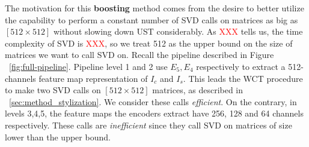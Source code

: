 The motivation for this \textbf{boosting} method comes from the desire to better utilize the capability to perform a constant number of SVD calls on matrices as big as $[512\times 512]$ without slowing down UST considerably. As \textcolor{red}{XXX} tells us, the time complexity of SVD is \textcolor{red}{XXX}, so we treat 512 as the upper bound on the size of matrices we want to call SVD on. Recall the pipeline described in Figure ~\ref{fig:full-pipeline}. Pipeline level 1 and 2 use $E_5, E_4$ respectively to extract a 512-channels feature map representation of $I_c$ and $I_s$. This leads the WCT procedure to make two SVD calls on $[512\times 512]$ matrices, as described in ~\ref{sec:method_stylization}. We consider these calls \textit{efficient}. On the contrary, in levels 3,4,5, the feature maps the encoders extract have 256, 128 and 64 channels respectively. These calls are \textit{inefficient} since they call SVD on matrices of size lower than the upper bound.\\

